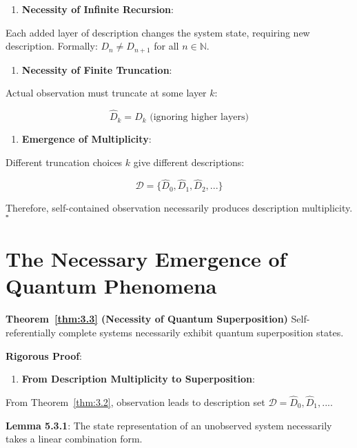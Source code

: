 \begin{enumerate}
\item \textbf{Necessity of Infinite Recursion}:
\end{enumerate}
   Each added layer of description changes the system state, requiring new description.
   Formally: $D_n \neq D_{n+1}$ for all $n \in \mathbb{N}$.
   
\begin{enumerate}
\item \textbf{Necessity of Finite Truncation}:
\end{enumerate}
   Actual observation must truncate at some layer $k$:
   
\begin{equation}
\hat{D}_k = D_k \text{ (ignoring higher layers)}
\end{equation}

\begin{enumerate}
\item \textbf{Emergence of Multiplicity}:
\end{enumerate}
   Different truncation choices $k$ give different descriptions:
   
\begin{equation}
\mathcal{D} = \{\hat{D}_0, \hat{D}_1, \hat{D}_2, ...\}
\end{equation}

Therefore, self-contained observation necessarily produces description multiplicity. $\square$

\section{The Necessary Emergence of Quantum Phenomena}
\label{sec:ch05_quantum:the-necessary-emergence-of-quantum-phenomena}

\textbf{Theorem~\ref{thm:3.3} (Necessity of Quantum Superposition)}
\label{thm:3.3}
Self-referentially complete systems necessarily exhibit quantum superposition states.

\textbf{Rigorous Proof}:

\begin{enumerate}
\item \textbf{From Description Multiplicity to Superposition}:
\end{enumerate}
   From Theorem~\ref{thm:3.2}, observation leads to description set $\mathcal{D} = {\hat{D}_0, \hat{D}_1, ...}$.
   
   \textbf{Lemma 5.3.1}: The state representation of an unobserved system necessarily takes a linear combination form.
\label{thm:3.3}
   
